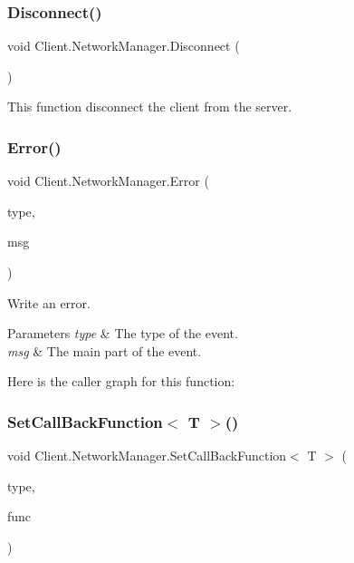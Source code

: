 \subsubsection{\texorpdfstring{Disconnect()}{Disconnect()}}
{\footnotesize\ttfamily void Client.\+Network\+Manager.\+Disconnect (\begin{DoxyParamCaption}{ }\end{DoxyParamCaption})\hspace{0.3cm}{\ttfamily [inline]}}

This function disconnect the client from the server. \mbox{\label{class_client_1_1_network_manager_ac1e0ad62226df6e63b02d0680fe9a8ca}} 
\subsubsection{\texorpdfstring{Error()}{Error()}}
{\footnotesize\ttfamily void Client.\+Network\+Manager.\+Error (\begin{DoxyParamCaption}\item[{string}]{type,  }\item[{string}]{msg }\end{DoxyParamCaption})\hspace{0.3cm}{\ttfamily [inline]}}

Write an error. 
\begin{DoxyParams}{Parameters}
{\em type} & The type of the event. \\
\hline
{\em msg} & The main part of the event. \\
\hline
\end{DoxyParams}
Here is the caller graph for this function\+:
\mbox{\label{class_client_1_1_network_manager_a153ce2acab6ca7ae2a16177603318328}} 
\subsubsection{\texorpdfstring{Set\+Call\+Back\+Function$<$ T $>$()}{SetCallBackFunction< T >()}}
{\footnotesize\ttfamily void Client.\+Network\+Manager.\+Set\+Call\+Back\+Function$<$ T $>$ (\begin{DoxyParamCaption}\item[{string}]{type,  }\item[{Network\+Comms.\+Packet\+Handler\+Call\+Back\+Delegate$<$ T $>$}]{func }\end{DoxyParamCaption})\hspace{0.3cm}{\ttfamily [inline]}}

